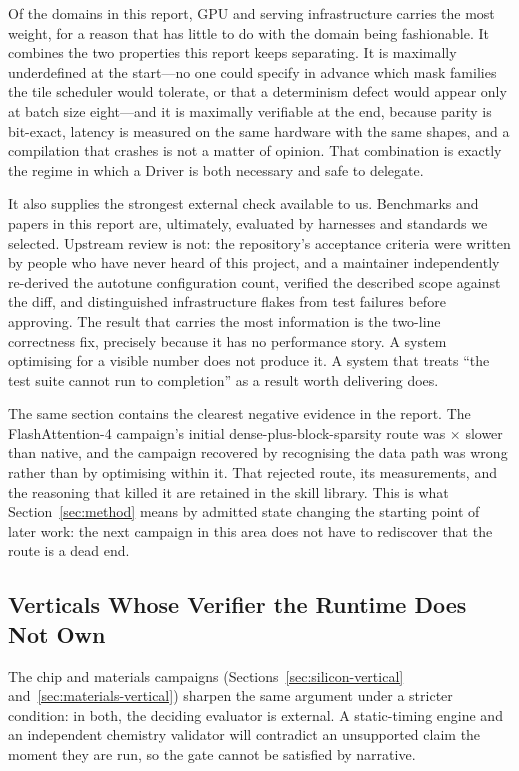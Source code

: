 Of the domains in this report, GPU and serving infrastructure carries the most
weight, for a reason that has little to do with the domain being fashionable. It
combines the two properties this report keeps separating. It is maximally
underdefined at the start---no one could specify in advance which mask families the
tile scheduler would tolerate, or that a determinism defect would appear only at
batch size eight---and it is maximally verifiable at the end, because parity is
bit-exact, latency is measured on the same hardware with the same shapes, and a
compilation that crashes is not a matter of opinion. That combination is exactly the
regime in which a Driver is both necessary and safe to delegate.

It also supplies the strongest external check available to us. Benchmarks and papers
in this report are, ultimately, evaluated by harnesses and standards we selected.
Upstream review is not: the repository's acceptance criteria were written by people
who have never heard of this project, and a maintainer independently re-derived the
autotune configuration count, verified the described scope against the diff, and
distinguished infrastructure flakes from test failures before approving. The result
that carries the most information is the two-line correctness fix, precisely because
it has no performance story. A system optimising for a visible number does not
produce it. A system that treats ``the test suite cannot run to completion'' as a
result worth delivering does.

The same section contains the clearest negative evidence in the report. The
FlashAttention-4 campaign's initial dense-plus-block-sparsity route was
\FlashDAWorstRoute$\times$ slower than native, and the campaign recovered by
recognising the data path was wrong rather than by optimising within it. That
rejected route, its measurements, and the reasoning that killed it are retained in
the skill library. This is what Section~\ref{sec:method} means by admitted state
changing the starting point of later work: the next campaign in this area does not
have to rediscover that the route is a dead end.

\subsection{Verticals Whose Verifier the Runtime Does Not Own}

The chip and materials campaigns (Sections~\ref{sec:silicon-vertical}
and~\ref{sec:materials-vertical}) sharpen the same argument under a stricter
condition: in both, the deciding evaluator is external. A static-timing engine and
an independent chemistry validator will contradict an unsupported claim the moment
they are run, so the gate cannot be satisfied by narrative.

